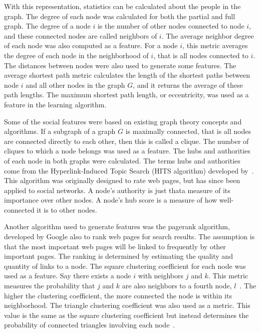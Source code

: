 \documentclass[10pt,twocolumn,conference]{IEEEtran}
\begin{document}
With this representation, statistics can be calculated about the people in the graph.
The degree of each node was calculated for both the partial and full graph.
The degree of a node $i$ is the number of other nodes connected to node $i$, and these connected nodes are called neighbors of $i$.
The average neighbor degree of each node was also computed as a feature.
For a node $i$, this metric averages the degree of each node in the neighborhood of $i$, that is all nodes connected to $i$.
The distances between nodes were also used to generate some features.
The average shortest path metric calculates the length of the shortest paths between node $i$ and all other nodes in the graph $G$, and it returns the average of these path lengths.
The maximum shortest path length, or eccentricity, was used as a feature in the learning algorithm.  

Some of the social features were based on existing graph theory concepts and algorithms.
If a subgraph of a graph $G$ is maximally connected, that is all nodes are connected directly to each other, then this is called a clique.
The number of cliques to which a node belongs was used as a feature.
The hubs and authorities of each node in both graphs were calculated.
The terms hubs and authorities come from the Hyperlink-Induced Topic Search (HITS algorithm) developed by~\cite{kleinberg_hubs_1999}.
This algorithm was originally designed to rate web pages, but has since been applied to social networks.
A node's authority is just that\textemdash{}a measure of its importance over other nodes.
A node's hub score is a measure of how well-connected it is to other nodes.

Another algorithm used to generate features was the pagerank algorithm, developed by Google 
\cite{page_pagerank_1999} also to rank web pages for search results.
The assumption is that the most important web pages will be linked to frequently by other important pages.
The ranking is determined by estimating the quality and quantity of links to a node.
The square clustering coefficient for each node was used as a feature.
Say there exists a node $i$ with neighbors $j$ and $k$.
This metric measures the probability that $j$ and $k$ are also neighbors to a fourth node, $l$~\cite{lind_cycles_2005}.
The higher the clustering coefficient, the more connected the node is within its neighborhood.
The triangle clustering coefficient was also used as a metric.
This value is the same as the square clustering coefficient but instead determines the probability of connected triangles involving each node~\cite{saramaki_generalizations_2007}.
\end{document}
